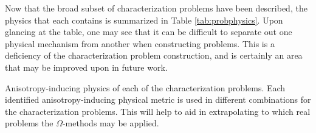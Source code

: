

Now that the broad subset of characterization problems have been described,
the physics that each contains is summarized in Table \ref{tab:probphysics}.
Upon glancing at the table, one may see that it can be difficult to separate
out one physical mechanism from another when constructing problems. This is a
deficiency of the characterization problem construction, and is certainly an
area that may be improved upon in future work.

\begin{table}[h!]
  \centering
  
  \caption[Anisotropy-inducing physics of each of the characterization problems.]
  {Anisotropy-inducing physics of each of the characterization problems.
  Each identified anisotropy-inducing physical metric is used in different
  combinations for the characterization problems. This will help to aid in
  extrapolating to which real problems the $\Omega$-methods may be applied.}
  \label{tab:probphysics}
\end{table}
